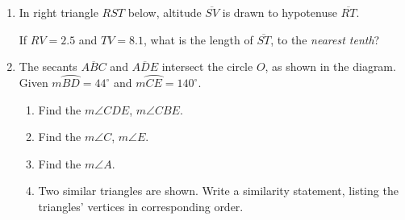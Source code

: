 \documentclass[12pt, oneside]{article}
\begin{document}
\begin{enumerate}[itemsep=1.2cm]
\item In right triangle $RST$ below, altitude $\overline{SV}$ is drawn to hypotenuse $\overline{RT}$.
  \begin{center}
  \end{center}
If $RV=2.5$ and $TV=8.1$, what is the length of $\overline{ST}$, to the \emph{nearest tenth}?

\item The secants $\overline{ABC}$ and $\overline{ADE}$ intersect the circle $O$, as shown in the diagram. \\Given $m \wideparen{BD}=44^\circ$ and $m \wideparen{CE}=140^\circ$.
  \begin{enumerate}
    \item Find the $m\angle CDE$, $m\angle CBE$.
    \item Find the $m\angle C$, $m\angle E$.
    \item Find the $m\angle A$.
    \item Two similar triangles are shown. Write a similarity statement, listing the triangles' vertices in corresponding order.
  \end{enumerate}
  \begin{center}
  \end{center}
  
\end{enumerate}
\end{document}
